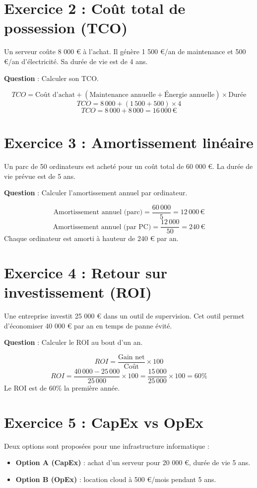 \documentclass[12pt,a4paper]{report}
\begin{document}
\section*{Exercice 2 : Coût total de possession (TCO)}
Un serveur coûte 8 000 € à l’achat.  
Il génère 1 500 €/an de maintenance et 500 €/an d’électricité.  
Sa durée de vie est de 4 ans.

\textbf{Question} : Calculer son TCO.

\begin{tcolorbox}[title={Correction}]
\[
TCO = \text{Coût d’achat} + (\text{Maintenance annuelle} + \text{Énergie annuelle}) \times \text{Durée}
\]
\[
TCO = 8\,000 + (1\,500 + 500) \times 4
\]
\[
TCO = 8\,000 + 8\,000 = 16\,000 \,€
\]
\end{tcolorbox}

\section*{Exercice 3 : Amortissement linéaire}
Un parc de 50 ordinateurs est acheté pour un coût total de 60 000 €.  
La durée de vie prévue est de 5 ans.

\textbf{Question} : Calculer l’amortissement annuel par ordinateur.

\begin{tcolorbox}[title={Correction}]
\[
\text{Amortissement annuel (parc)} = \frac{60\,000}{5} = 12\,000 \,€ 
\]
\[
\text{Amortissement annuel (par PC)} = \frac{12\,000}{50} = 240 \,€
\]
Chaque ordinateur est amorti à hauteur de 240 € par an.
\end{tcolorbox}

\section*{Exercice 4 : Retour sur investissement (ROI)}
Une entreprise investit 25 000 € dans un outil de supervision.  
Cet outil permet d’économiser 40 000 € par an en temps de panne évité.  

\textbf{Question} : Calculer le ROI au bout d’un an.

\begin{tcolorbox}[title={Correction}]
\[
ROI = \frac{\text{Gain net}}{\text{Coût}} \times 100
\]
\[
ROI = \frac{40\,000 - 25\,000}{25\,000} \times 100 = \frac{15\,000}{25\,000} \times 100 = 60\%
\]
Le ROI est de 60\% la première année.
\end{tcolorbox}

\section*{Exercice 5 : CapEx vs OpEx}
Deux options sont proposées pour une infrastructure informatique :
\begin{itemize}
  \item \textbf{Option A (CapEx)} : achat d’un serveur pour 20 000 €, durée de vie 5 ans.
  \item \textbf{Option B (OpEx)} : location cloud à 500 €/mois pendant 5 ans.
\end{itemize}
\end{document}
